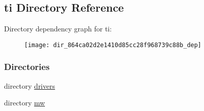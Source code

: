 \subsection{ti Directory Reference}
\label{dir_864ca02d2e1410d85cc28f968739c88b}
Directory dependency graph for ti\+:
\nopagebreak
\begin{figure}[H]
\begin{center}
\leavevmode
\texttt{[image: dir\_864ca02d2e1410d85cc28f968739c88b\_dep]}
\end{center}
\end{figure}
\subsubsection*{Directories}
\begin{DoxyCompactItemize}
\item 
directory \hyperlink{dir_0cb81fd6c85f019880acb70b2ad7d838}{drivers}
\item 
directory \hyperlink{dir_bba4f83f581bdc46454983254f1d0913}{mw}
\end{DoxyCompactItemize}
